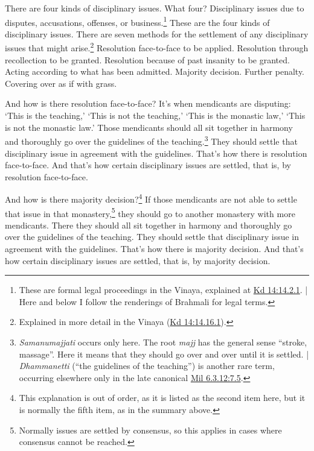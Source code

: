 \documentclass[12pt,openany]{book}%
\begin{document}
There are four kinds of disciplinary issues. What four? Disciplinary issues due to disputes, accusations, offenses, or business.\footnote{These are formal legal proceedings in the Vinaya, explained at \href{https://suttacentral.net/pli-tv-kd14/en/sujato\#14.2.1}{Kd 14:14.2.1}. | Here and below I follow the renderings of Brahmali for legal terms. } These are the four kinds of disciplinary issues. There are seven methods for the settlement of any disciplinary issues that might arise.\footnote{Explained in more detail in the Vinaya (\href{https://suttacentral.net/pli-tv-kd14/en/sujato\#14.16.1}{Kd 14:14.16.1}). } Resolution face-to-face to be applied. Resolution through recollection to be granted. Resolution because of past insanity to be granted. Acting according to what has been admitted. Majority decision. Further penalty. Covering over as if with grass. 

And how is there resolution face-to-face? It’s when mendicants are disputing: ‘This is the teaching,’ ‘This is not the teaching,’ ‘This is the monastic law,’ ‘This is not the monastic law.’ Those mendicants should all sit together in harmony and thoroughly go over the guidelines of the teaching.\footnote{\textit{Samanumajjati} occurs only here. The root \textit{majj} has the general sense “stroke, massage”. Here it means that they should go over and over until it is settled. | \textit{Dhammanetti} (“the guidelines of the teaching”) is another rare term, occurring elsewhere only in the late canonical \href{https://suttacentral.net/mil6.3.12/en/sujato\#7.5}{Mil 6.3.12:7.5}. } They should settle that disciplinary issue in agreement with the guidelines. That’s how there is resolution face-to-face. And that’s how certain disciplinary issues are settled, that is, by resolution face-to-face. 

And how is there majority decision?\footnote{This explanation is out of order, as it is listed as the second item here, but it is normally the fifth item, as in the summary above. } If those mendicants are not able to settle that issue in that monastery,\footnote{Normally issues are settled by consensus, so this applies in cases where consensus cannot be reached. } they should go to another monastery with more mendicants. There they should all sit together in harmony and thoroughly go over the guidelines of the teaching. They should settle that disciplinary issue in agreement with the guidelines. That’s how there is majority decision. And that’s how certain disciplinary issues are settled, that is, by majority decision. 
\end{document}
